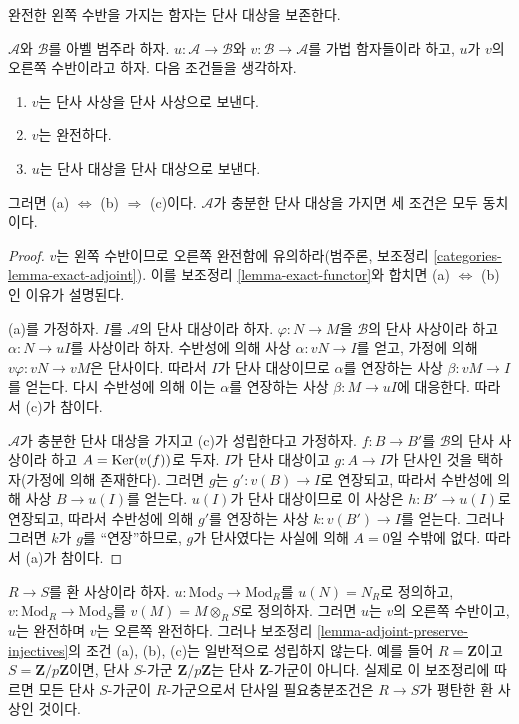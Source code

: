 \begin{lemma}
\label{lemma-adjoint-preserve-injectives}
\begin{slogan}
완전한 왼쪽 수반을 가지는 함자는 단사 대상을 보존한다.
\end{slogan}
$\mathcal{A}$와 $\mathcal{B}$를 아벨 범주라 하자.
$u : \mathcal{A} \to \mathcal{B}$와
$v : \mathcal{B} \to \mathcal{A}$를 가법 함자들이라 하고, $u$가
$v$의 오른쪽 수반이라고 하자. 다음 조건들을 생각하자.
\begin{enumerate}
\item[(a)] $v$는 단사 사상을 단사 사상으로 보낸다.
\item[(b)] $v$는 완전하다.
\item[(c)] $u$는 단사 대상을 단사 대상으로 보낸다.
\end{enumerate}
그러면 (a) $\Leftrightarrow$ (b) $\Rightarrow$ (c)이다.
$\mathcal{A}$가 충분한 단사 대상을 가지면 세 조건은 모두 동치이다.
\end{lemma}

\begin{proof}
$v$는 왼쪽 수반이므로 오른쪽 완전함에 유의하라(범주론, 보조정리
\ref{categories-lemma-exact-adjoint}). 이를 보조정리
\ref{lemma-exact-functor}와 합치면 (a) $\Leftrightarrow$ (b)인 이유가
설명된다.

\medskip\noindent
(a)를 가정하자. $I$를 $\mathcal{A}$의 단사 대상이라 하자.
$\varphi : N \to M$을 $\mathcal{B}$의 단사 사상이라 하고
$\alpha : N \to uI$를 사상이라 하자. 수반성에 의해 사상
$\alpha : vN \to I$를 얻고, 가정에 의해
$v\varphi : vN \to vM$은 단사이다. 따라서 $I$가 단사 대상이므로
$\alpha$를 연장하는 사상 $\beta : vM \to I$를 얻는다. 다시 수반성에
의해 이는 $\alpha$를 연장하는 사상 $\beta : M \to uI$에 대응한다.
따라서 (c)가 참이다.

\medskip\noindent
$\mathcal{A}$가 충분한 단사 대상을 가지고 (c)가 성립한다고 가정하자.
$f : B \to B'$를 $\mathcal{B}$의 단사 사상이라 하고
$A = \mathop{\mathrm{Ker}}(v(f))$로 두자. $I$가 단사 대상이고 $g : A \to I$가 단사인
것을 택하자(가정에 의해 존재한다). 그러면 $g$는
$g' : v(B) \to I$로 연장되고, 따라서 수반성에 의해 사상
$B \to u(I)$를 얻는다. $u(I)$가 단사 대상이므로 이 사상은
$h : B' \to u(I)$로 연장되고, 따라서 수반성에 의해 $g'$를 연장하는
사상 $k : v(B') \to I$를 얻는다. 그러나 그러면 $k$가 $g$를
“연장”하므로, $g$가 단사였다는 사실에 의해 $A = 0$일 수밖에 없다.
따라서 (a)가 참이다.
\end{proof}

\begin{remark}
\label{remark-need-left-exactness}
$R \to S$를 환 사상이라 하자.
$u : \text{Mod}_S \to \text{Mod}_R$를 $u(N) = N_R$로 정의하고,
$v : \text{Mod}_R \to \text{Mod}_S$를
$v(M) = M \otimes_R S$로 정의하자. 그러면 $u$는 $v$의 오른쪽
수반이고, $u$는 완전하며 $v$는 오른쪽 완전하다. 그러나 보조정리
\ref{lemma-adjoint-preserve-injectives}의 조건 (a), (b), (c)는 일반적으로
성립하지 않는다. 예를 들어 $R = \mathbf{Z}$이고
$S = \mathbf{Z}/p\mathbf{Z}$이면, 단사 $S$-가군
$\mathbf{Z}/p\mathbf{Z}$는 단사 $\mathbf{Z}$-가군이 아니다.
실제로 이 보조정리에 따르면 모든 단사 $S$-가군이 $R$-가군으로서
단사일 필요충분조건은 $R \to S$가 평탄한 환 사상인 것이다.
\end{remark}

